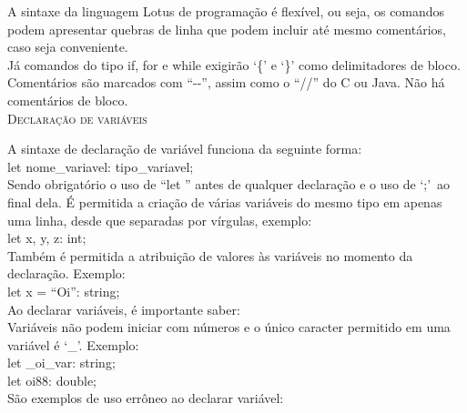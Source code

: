 \documentclass[12pt,a4paper]{article}
\begin{document}
A sintaxe da linguagem Lotus de programação é flexível, ou seja, os comandos podem apresentar quebras de linha que podem incluir até mesmo comentários, caso seja conveniente. \\




Já comandos do tipo if, for e while exigirão `\{' e `\}' como delimitadores de bloco.
Comentários são marcados com ``-{}-'', assim como o ``//'' do C ou Java. Não há comentários de bloco.\\

\hypertarget{label}{\Large{\textsc{Declaração de variáveis}}}\\[0.3cm]
\normalsize

A sintaxe de declaração de variável funciona da seguinte forma:\\

let nome\_variavel: tipo\_variavel;\\

Sendo obrigatório o uso de ``let '' antes de qualquer declaração e o uso de `;'\ ao final dela. É permitida a criação de várias variáveis do mesmo tipo em apenas uma linha, desde que separadas por vírgulas, exemplo:\\

let x, y, z: int;\\

Também é permitida a atribuição de valores às variáveis no momento da declaração. Exemplo:\\

let x = ``Oi'': string;\\

Ao declarar variáveis, é importante saber: \\

Variáveis não podem iniciar com números e o único caracter permitido em uma variável é `\_'. Exemplo: \\

let \_oi\_var: string;\\

let oi88: double;\\

São exemplos de uso errôneo ao declarar variável:\\
\end{document}
